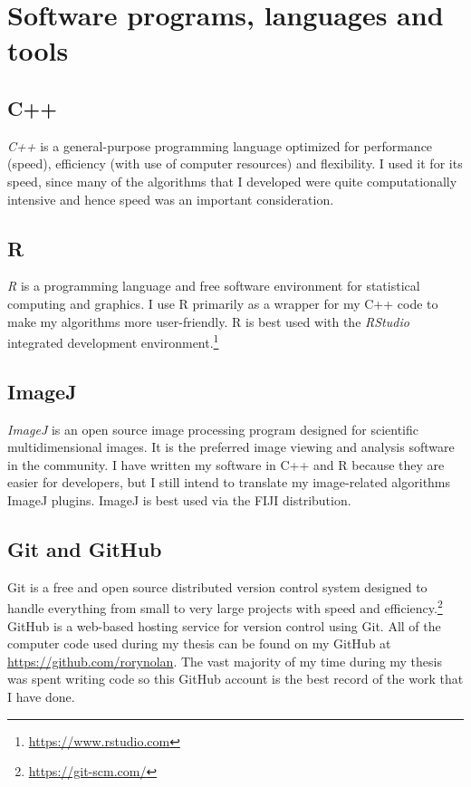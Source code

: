 \documentclass[12pt,]{book}
\let\rmarkdownfootnote\footnote%
\def\footnote{\protect\rmarkdownfootnote}
\theoremstyle{definition}
\theoremstyle{definition}
\theoremstyle{definition}
\theoremstyle{remark}
\begin{document}
\section{Software programs, languages and
tools}\label{software-programs-languages-and-tools}

\subsection{C++}\label{c}

\emph{C++} \citep{cpp} is a general-purpose programming language
optimized for performance (speed), efficiency (with use of computer
resources) and flexibility. I used it for its speed, since many of the
algorithms that I developed were quite computationally intensive and
hence speed was an important consideration.

\subsection{R}\label{r}

\emph{R} \citep{R} is a programming language and free software
environment for statistical computing and graphics. I use R primarily as
a wrapper for my C++ code to make my algorithms more user-friendly. R is
best used with the \emph{RStudio} integrated development
environment.\footnote{\url{https://www.rstudio.com}}

\subsection{ImageJ}\label{imagej}

\emph{ImageJ} \citep{ImageJ} is an open source image processing program
designed for scientific multidimensional images. It is the preferred
image viewing and analysis software in the community. I have written my
software in C++ and R because they are easier for developers, but I
still intend to translate my image-related algorithms ImageJ plugins.
ImageJ is best used via the FIJI \citep{FIJI} distribution.

\subsection{Git and GitHub}\label{git-and-github}

Git is a free and open source distributed version control system
designed to handle everything from small to very large projects with
speed and efficiency.\footnote{\url{https://git-scm.com/}} GitHub is a
web-based hosting service for version control using Git. All of the
computer code used during my thesis can be found on my GitHub at
\url{https://github.com/rorynolan}. The vast majority of my time during
my thesis was spent writing code so this GitHub account is the best
record of the work that I have done.
\end{document}
